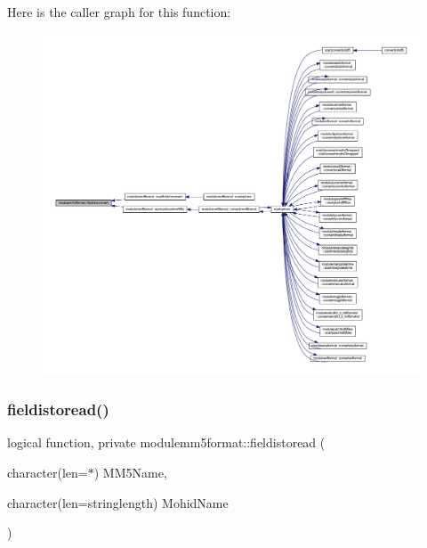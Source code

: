 Here is the caller graph for this function\+:\nopagebreak
\begin{figure}[H]
\begin{center}
\leavevmode
\includegraphics[width=350pt]{namespacemodulemm5format_a06df0a4d83e5c07c6427f1e426280250_icgraph}
\end{center}
\end{figure}
\mbox{\label{namespacemodulemm5format_a0fb6edd1ddbebdd980a7396df7323e1a}} 
\subsubsection{\texorpdfstring{fieldistoread()}{fieldistoread()}}
{\footnotesize\ttfamily logical function, private modulemm5format\+::fieldistoread (\begin{DoxyParamCaption}\item[{character(len=$\ast$)}]{M\+M5\+Name,  }\item[{character(len=stringlength)}]{Mohid\+Name }\end{DoxyParamCaption})\hspace{0.3cm}{\ttfamily [private]}}

